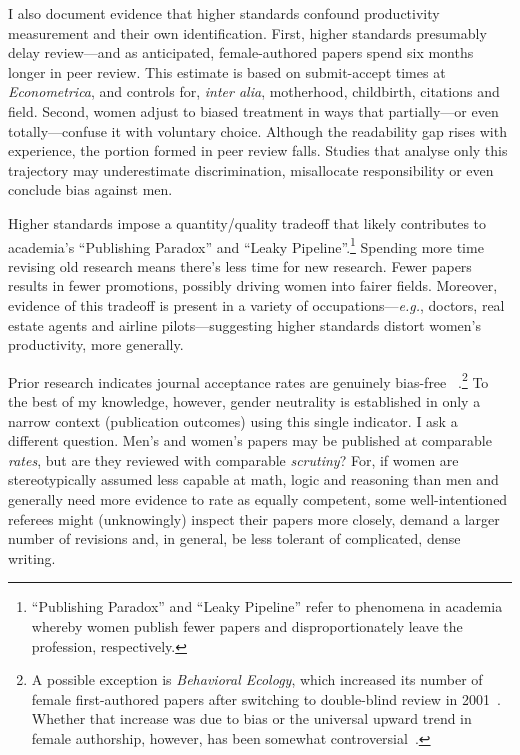 I also document evidence that higher standards confound productivity measurement and their own identification. First, higher standards presumably delay review---and as anticipated, female-authored papers spend six months longer in peer review. This estimate is based on submit-accept times at \emph{Econometrica}, and controls for, \emph{inter alia}, motherhood, childbirth, citations and field. Second, women adjust to biased treatment in ways that partially---or even totally---confuse it with voluntary choice. Although the readability gap rises with experience, the portion formed in peer review falls. Studies that analyse only this trajectory may underestimate discrimination, misallocate responsibility or even conclude bias against men.

Higher standards impose a quantity\slash quality tradeoff that likely contributes to academia's ``Publishing Paradox'' and ``Leaky Pipeline''.\footnote{``Publishing Paradox'' and ``Leaky Pipeline'' refer to phenomena in academia whereby women publish fewer papers and disproportionately leave the profession, respectively.} Spending more time revising old research means there's less time for new research. Fewer papers results in fewer promotions, possibly driving women into fairer fields. Moreover, evidence of this tradeoff is present in a variety of occupations---\emph{e.g.}, doctors, real estate agents and airline pilots---suggesting higher standards distort women's productivity, more generally.

\vspace*{\baselineskip}

Prior research indicates journal acceptance rates are genuinely bias-free ~\citep[see, \emph{e.g.},][]{Blank1991,Borsuk2009,Gilbert1994}.\footnote{A possible exception is \emph{Behavioral Ecology}, which increased its number of female first-authored papers after switching to double-blind review in 2001~\citep{Budden2008a}. Whether that increase was due to bias or the universal upward trend in female authorship, however, has been somewhat controversial~\citep{Budden2008b,Budden2008c,Webb2008,Whittaker2008}.} To the best of my knowledge, however, gender neutrality is established in only a narrow context (publication outcomes) using this single indicator. I ask a different question. Men's and women's papers may be published at comparable \emph{rates}, but are they reviewed with comparable \emph{scrutiny}? For, if women are stereotypically assumed less capable at math, logic and reasoning than men and generally need more evidence to rate as equally competent, some well-intentioned referees might (unknowingly) inspect their papers more closely, demand a larger number of revisions and, in general, be less tolerant of complicated, dense writing.

